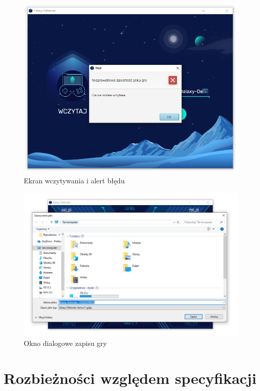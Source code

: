 \documentclass[a4paper]{article}
\begin{document}
\begin{figure}[H]
    \centering
    \includegraphics[width=1\textwidth]{img/ekran-wczytywania-screenshot.png}
    \caption{Ekran wczytywania i alert błędu}
    \label{fig:read}
\end{figure}

\begin{figure}[H]
    \centering
    \includegraphics[width=1\textwidth]{img/zapisywanie-gry-screenshot.png}
    \caption{Okno dialogowe zapisu gry}
    \label{fig:save}
\end{figure}

\section{Rozbieżności względem specyfikacji}
\end{document}
